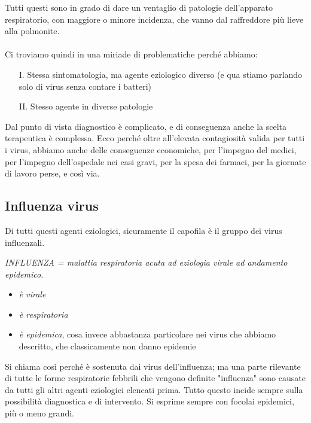   Tutti questi sono in grado di dare un ventaglio di patologie
  dell'apparato respiratorio, con maggiore o minore incidenza, che vanno
  dal raffreddore più lieve alla polmonite.
\\\\
  Ci troviamo quindi in una miriade di problematiche perché abbiamo:
\begin{itemize}
\item[I.] Stessa sintomatologia, ma agente eziologico diverso (e qua stiamo
  parlando solo di virus senza contare i batteri)
\item[II.] Stesso agente in diverse patologie
\end{itemize}
  Dal punto di vista diagnostico è complicato, e di conseguenza anche la
  scelta terapeutica è complessa. Ecco perché oltre all'elevata
  contagiosità valida per tutti i virus, abbiamo anche delle conseguenze
  economiche, per l'impegno del medici, per l'impegno dell'ospedale nei
  casi gravi, per la spesa dei farmaci, per la giornate di lavoro perse,
  e così via.

\subsection{Influenza virus}

  Di tutti questi agenti eziologici, sicuramente il capofila è il gruppo
  dei virus influenzali.

  \emph{INFLUENZA = malattia respiratoria acuta ad eziologia virale ad
  andamento epidemico. }

\begin{itemize}
\item
  \emph{è virale}
\item
  \emph{è respiratoria}
\item
  \emph{è epidemica}, cosa invece abbastanza particolare nei virus che
  abbiamo descritto, che classicamente non danno epidemie
\end{itemize}

  Si chiama così perché è sostenuta dai virus dell'influenza; ma una
  parte rilevante di tutte le forme respiratorie febbrili che vengono
  definite "influenza" sono causate da tutti gli altri agenti eziologici
  elencati prima. Tutto questo incide sempre sulla possibilità
  diagnostica e di intervento. Si esprime sempre con focolai epidemici,
  più o meno grandi.

